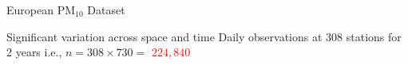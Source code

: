 \begin{frame}{European PM$_{10}$ Dataset}
\begin{figure}[]
\begin{center}
\vskip-4mm{}
\end{center}
\end{figure}
\vspace{-0.5cm}
\begin{itemize}
\myitem Significant variation across space and time
\myitem Daily observations at $308$ stations for 2 years i.e., $n=308\times 730=$ \textcolor{red}{$224,840$}
\end{itemize}
\end{frame}

